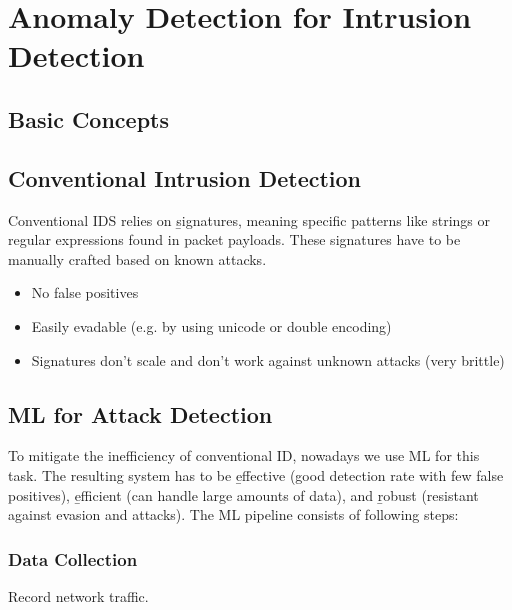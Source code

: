\section{Anomaly Detection for Intrusion Detection}

\subsection{Basic Concepts}



\subsection{Conventional Intrusion Detection}
Conventional IDS relies on \b{signatures}, meaning specific patterns like strings or regular expressions found in packet payloads. These signatures have to be manually crafted based on known attacks.
\begin{itemize}
    \item[$+$] No false positives
    \item[$-$] Easily evadable (e.g. by using unicode or double encoding) 
    \item[$-$] Signatures don't scale and don't work against unknown attacks (very brittle)
\end{itemize}


\subsection{ML for Attack Detection}
To mitigate the inefficiency of conventional ID, nowadays we use ML for this task. The resulting system has to be \b{effective} (good detection rate with few false positives), \b{efficient} (can handle large amounts of data), and \b{robust} (resistant against evasion and attacks). The ML pipeline consists of following steps:

\subsubsection{Data Collection}
Record network traffic.

